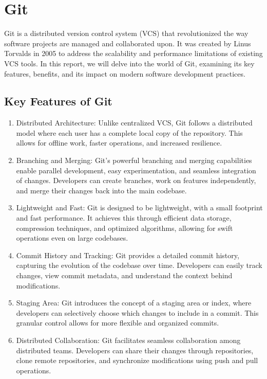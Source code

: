 \newpage


\section*{Git}

Git is a distributed version control system (VCS) that revolutionized the way software projects are managed and collaborated upon. It was created by Linus Torvalds in 2005 to address the scalability and performance limitations of existing VCS tools. In this report, we will delve into the world of Git, examining its key features, benefits, and its impact on modern software development practices.

\subsection*{Key Features of Git}

\begin{enumerate}
    \item Distributed Architecture: Unlike centralized VCS, Git follows a distributed model where each user has a complete local copy of the repository. This allows for offline work, faster operations, and increased resilience.

    \item Branching and Merging: Git's powerful branching and merging capabilities enable parallel development, easy experimentation, and seamless integration of changes. Developers can create branches, work on features independently, and merge their changes back into the main codebase.

    \item Lightweight and Fast: Git is designed to be lightweight, with a small footprint and fast performance. It achieves this through efficient data storage, compression techniques, and optimized algorithms, allowing for swift operations even on large codebases.

    \item Commit History and Tracking: Git provides a detailed commit history, capturing the evolution of the codebase over time. Developers can easily track changes, view commit metadata, and understand the context behind modifications.

    \item Staging Area: Git introduces the concept of a staging area or index, where developers can selectively choose which changes to include in a commit. This granular control allows for more flexible and organized commits.

    \item Distributed Collaboration: Git facilitates seamless collaboration among distributed teams. Developers can share their changes through repositories, clone remote repositories, and synchronize modifications using push and pull operations.
\end{enumerate}

